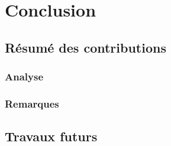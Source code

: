 \stopcontents[chapters]
\chapter*{Conclusion}

\fancyhead{}

\section*{Résumé des contributions}

\lipsum[1]

\lipsum[2]

\subsection*{Analyse}

\lipsum[3]

\lipsum[4]

\subsection*{Remarques}

\lipsum[5]

\lipsum[6]

\section*{Travaux futurs}

\lipsum[7]

\lipsum[8]
